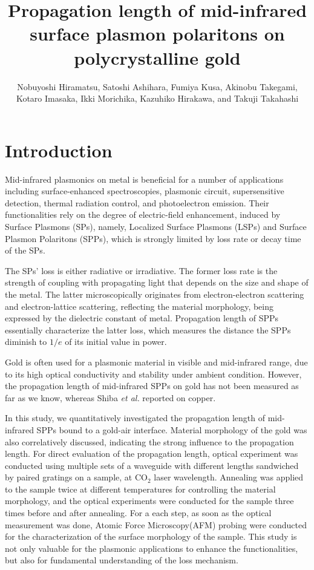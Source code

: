 \documentclass[twocolumn,11pt,a4]{article}
\begin{document}
\title{Propagation length of mid-infrared surface plasmon polaritons on polycrystalline gold}
\author{Nobuyoshi Hiramatsu, Satoshi Ashihara, Fumiya Kusa, Akinobu Takegami,\\ Kotaro Imasaka, Ikki Morichika, Kazuhiko Hirakawa, and Takuji Takahashi }
\maketitle

\section{Introduction}
Mid-infrared plasmonics on metal is beneficial for a number of applications including surface-enhanced spectroscopies, plasmonic circuit, supersensitive detection, thermal radiation control, and photoelectron emission\cite{Kusa2015}. 
Their functionalities rely on the degree of electric-field enhancement, induced by Surface Plasmons (SPs), namely, Localized Surface Plasmons (LSPs) and Surface Plasmon Polaritons (SPPs), which is strongly limited by loss rate or decay time of the SPs.

The SPs' loss is either radiative or irradiative. 
The former loss rate is the strength of coupling with propagating light that depends on the size and shape of the metal\cite{Kusa2014}. 
The latter microscopically originates from electron-electron scattering and electron-lattice scattering, reflecting the material morphology, being expressed by the dielectric constant of metal.
Propagation length of SPPs essentially characterize the latter loss, which measures the distance the SPPs diminish to $1/e$ of its initial value in power\cite{William}.

Gold is often used for a plasmonic material in visible and mid-infrared range, due to its high optical conductivity and stability under ambient condition\cite{Olmon}. 
However, the propagation length of mid-infrared SPPs on gold has not been measured as far as we know, whereas Shiba {\it et al.} reported on copper\cite{Shiba}.

In this study, we quantitatively investigated the propagation length of mid-infrared SPPs bound to a gold-air interface.
Material morphology of the gold was also correlatively discussed, indicating the strong influence to the propagation length. 
For direct evaluation of the propagation length, optical experiment was conducted using multiple sets of a waveguide with different lengths sandwiched by paired gratings on a sample, at $\mathrm{CO_2}$ laser wavelength. 
Annealing was applied to the sample twice at different temperatures for controlling the material morphology, and the optical experiments were conducted for the sample three times before and after annealing. 
For a each step, as soon as the optical measurement was done, Atomic Force Microscopy(AFM) probing were conducted for the characterization of the surface morphology of the sample. 
This study is not only valuable for the plasmonic applications to enhance the functionalities, but also for fundamental understanding of the loss mechanism.
\end{document}
